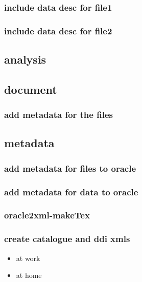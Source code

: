 \documentclass[a4paper]{article}
\begin{document}
\subsubsection{include data desc for file1}
\label{sec-10-5-1}
\subsubsection{include data desc for file2}
\label{sec-10-5-2}
\subsection{analysis}
\label{sec-10-6}
\subsection{document}
\label{sec-10-7}
\subsubsection{add metadata for the files}
\label{sec-10-7-1}
\subsection{metadata}
\label{sec-10-8}
\subsubsection{add metadata for files to oracle}
\label{sec-10-8-1}
\subsubsection{add metadata for data to oracle}
\label{sec-10-8-2}
\subsubsection{oracle2xml-makeTex}
\label{sec-10-8-3}


 
\subsubsection{create catalogue and ddi xmls}
\label{sec-10-8-4}
\begin{itemize}

\item at work\\
\label{sec-10-8-4-1}%
\item at home\\
\label{sec-10-8-4-2}%
\end{itemize} %
\end{document}
